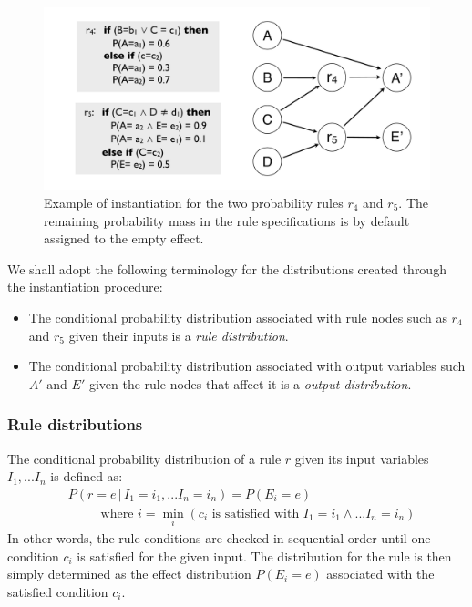 \begin{figure}[h]
\centering
\includegraphics[scale=0.25]{imgs/ruleinstantiation.pdf}
\caption{Example of instantiation for the two probability rules $r_4$ and $r_5$. The remaining probability mass in the rule specifications is by default assigned to the empty effect. }
\label{fig:instantiationprob}
\end{figure}

We shall adopt the following terminology for the distributions created through the instantiation procedure: 
\begin{itemize}
\item The conditional probability distribution associated with rule nodes such as $r_4$ and $r_5$ given their inputs is a \textit{rule distribution}.
\item The conditional probability distribution associated with output variables such $A'$ and $E'$ given the rule nodes that affect it is a \textit{output distribution}.
\end{itemize}

\subsubsection*{Rule distributions}

The conditional probability distribution of a rule $r$ given its input variables $I_1,...I_n$ is defined as: 
\begin{align}
& P(r\!=\!e \, | \, I_1\!=\!i_1,... I_n\!=\!i_n) = P(E_i = e) \label{eq:ruledistrib}
 \\ 
& \; \; \; \; \; \; \; \; \text{ where } i = \min_i (c_i \text{ is satisfied with } I_1\!=\!i_1 \land ... I_n\!=\!i_n) \nonumber 
\end{align}
In other words, the rule conditions are checked in sequential order until one condition $c_i$ is satisfied for the given input.  The distribution for the rule is then simply determined as the effect distribution $P(E_i\!=\!e)$ associated with the satisfied condition $c_i$. 

